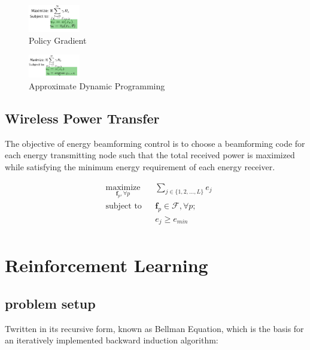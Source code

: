 \documentclass[journal]{IEEEtran}
\begin{document}
\begin{figure}[H]
    \centering
    \includegraphics[width=0.2\textwidth]{Control3.png}
    \caption{Policy Gradient}
    \label{fig:PC}
\end{figure}

\begin{figure}[H]
    \centering
    \includegraphics[width=0.2\textwidth]{Control4.png}
    \caption{Approximate Dynamic Programming}
    \label{fig:ADP}
\end{figure}



\subsection{Wireless Power Transfer}

The objective of energy beamforming control is to choose a beamforming code for each energy transmitting node such that the total received power is maximized while satisfying the minimum energy requirement of each energy receiver.

\begin{equation*}
    \begin{aligned}
        & \underset{ \textbf{f}_p, \forall p}{\text{maximize}}
        && \displaystyle\sum_{j \in \{1,2,...,L\}} e_j\\
        & \text{subject to}
        && \textbf{f}_p \in \mathcal{F}, \forall p;\\
        &&& e_j \geq e_{min}\\
    \end{aligned}
\end{equation*}


\section{Reinforcement Learning}


\subsection{problem setup}
Twritten in its recursive form, known as Bellman Equation, which is the basis for an iteratively implemented backward induction algorithm:
\end{document}
